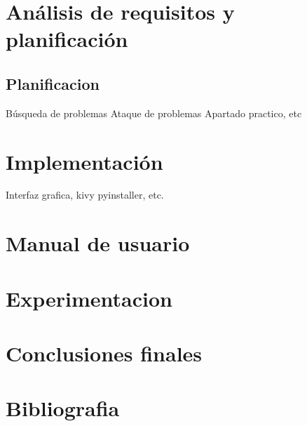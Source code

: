 \documentclass[11pt, spanish]{report}
\begin{document}
\section{Análisis de requisitos y planificación}
    \subsection{Planificacion }
    Búsqueda de problemas
    Ataque de problemas
    Apartado practico, etc

\section{Implementación}
Interfaz grafica, kivy pyinstaller, etc. 

\section{Manual de usuario}

\section{Experimentacion}
\section{Conclusiones finales}
\section{Bibliografia}
\end{document}
